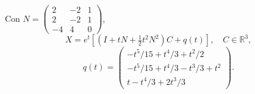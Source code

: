 Con \(N=\left(\begin{smallmatrix}2&-2&1\\2&-2&1\\-4&4&0\end{smallmatrix}\right)\),
\[X=e^t\left[(I+tN+\tfrac12t^2N^2)C+q(t)\right],\quad C\in\mathbb R^3,\]
\[q(t)=\begin{pmatrix}-t^5/15+t^4/3+t^2/2\\-t^5/15+t^4/3-t^3/3+t^2\\t- t^4/3+2t^3/3\end{pmatrix}.\]
